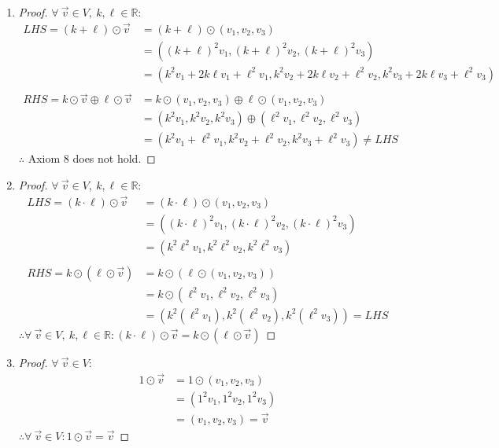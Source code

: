 \documentclass{article}
\newcommand{\bld}{\textbf}
\newcommand{\bb}{\mathbb}
\newcommand{\bitem}[1]{\item[\bld{#1.}]}
\begin{document}
\begin{enumerate}
  \bitem{Axiom 8}
  \begin{proof}
    $\forall~\vec{v} \in V,~k,\ell \in \bb{R}$:
    \begin{align*}
      LHS = (k+\ell) \odot \vec{v}                    & = (k+\ell) \odot (v_1,v_2,v_3)                                                          \\
                                                      & = ((k+\ell)^2v_1,(k+\ell)^2v_2,(k+\ell)^2v_3)                                           \\
                                                      & = (k^2v_1+2k\ell v_1+\ell^2v_1,k^2v_2+2k\ell v_2+\ell^2v_2,k^2v_3+2k\ell v_3+\ell^2v_3) \\ \\
      RHS = k \odot \vec{v} \oplus \ell \odot \vec{v} & = k \odot (v_1,v_2,v_3) \oplus \ell \odot (v_1,v_2,v_3)                                 \\
                                                      & = (k^2v_1,k^2v_2,k^2v_3) \oplus (\ell^2v_1,\ell^2v_2,\ell^2v_3)                         \\
                                                      & = (k^2v_1 + \ell^2v_1, k^2v_2 + \ell^2v_2, k^2v_3 + \ell^2v_3) \neq LHS
    \end{align*}
    $\therefore$ Axiom 8 does not hold.
  \end{proof}
  \bitem{Axiom 9}
  \begin{proof}
    $\forall~\vec{v} \in V,~k,\ell \in \bb{R}$:
    \begin{align*}
      LHS = (k \cdot \ell) \odot \vec{v} & = (k \cdot \ell) \odot (v_1,v_2,v_3)                              \\
                                         & = ((k \cdot \ell)^2v_1, (k \cdot \ell)^2v_2, (k \cdot \ell)^2v_3) \\
                                         & = (k^2\ell^2v_1,k^2\ell^2v_2,k^2\ell^2v_3)                        \\ \\
      RHS = k \odot (\ell \odot \vec{v}) & = k \odot (\ell \odot (v_1,v_2,v_3))                              \\
                                         & = k \odot (\ell^2v_1,\ell^2v_2,\ell^2v_3)                         \\
                                         & = (k^2(\ell^2v_1),k^2(\ell^2v_2),k^2(\ell^2v_3)) = LHS
    \end{align*}
    $\therefore \forall~\vec{v} \in V,~k,\ell \in \bb{R}: (k \cdot \ell) \odot \vec{v} = k \odot (\ell \odot \vec{v})$
  \end{proof}
  \bitem{Axiom 10}
  \begin{proof}
    $\forall~\vec{v} \in V$:
    \begin{align*}
      1 \odot \vec{v} & = 1 \odot (v_1,v_2,v_3)   \\
                      & = (1^2v_1,1^2v_2,1^2v_3)  \\
                      & = (v_1,v_2,v_3) = \vec{v}
    \end{align*}
    $\therefore \forall~\vec{v} \in V: 1 \odot \vec{v} = \vec{v}$
  \end{proof}
\end{enumerate}
\end{document}
